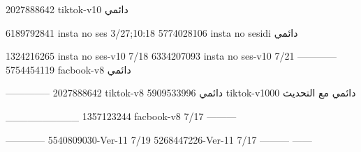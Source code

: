 2027888642 tiktok-v10
دائمي

6189792841 insta no ses
3/27;10:18
5774028106 insta no sesidi
دائمي

1324216265 insta no ses-v10
7/18
6334207093 insta no ses-v10
7/21
------------
5754454119 facbook-v8
دائمي


--------------
2027888642 tiktok-v8
دائمي
5909533996 tiktok-v1000
دائمي مع التحديث

__________
1357123244 facbook-v8
7/17
---------

------------
5540809030-Ver-11
7/19
5268447226-Ver-11
7/17
---------
------
